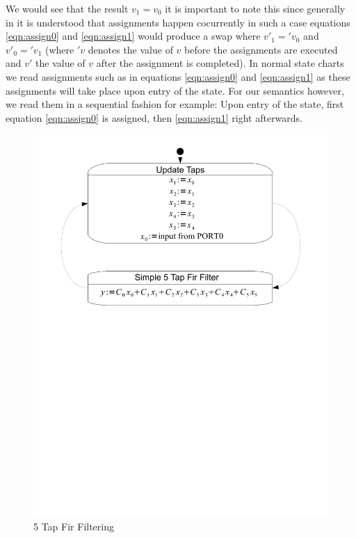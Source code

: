 We would see that the result $v_1 = v_0$ it is important to note this since generally in \cite{StateChartVis}  it is understood that assignments happen cocurrently in such a case equations \ref{eqn:assign0} and \ref{eqn:assign1} would produce a swap where $v'_1 = 'v_0$ and $v'_0 = 'v_1$ (where $'v$ denotes the value of $v$ before the assignments are executed and $v'$ the value of $v$ after the assignment is completed). In normal state charts we read assignments such as in equations \ref{eqn:assign0} and \ref{eqn:assign1} as these assignments will take place upon entry of the state. For our semantics however, we read them in a sequential fashion for example: Upon entry of the state, first equation \ref{eqn:assign0} is assigned, then \ref{eqn:assign1} right afterwards.

\begin{figure}[htp]
    \centering
    \includegraphics[trim= 10mm 145mm 10mm 10mm, clip, width=\imgmedium]{./images/state_uml2_fir.pdf}
    \caption{5 Tap Fir Filtering}
    \label{fig:state_uml2_fir}
\end{figure}

